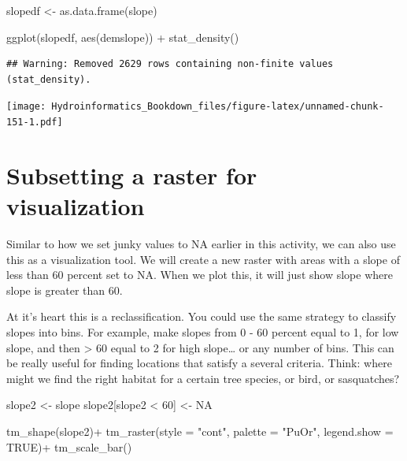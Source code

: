 \documentclass[
]{book}
\newenvironment{Shaded}{\begin{snugshade}}{\end{snugshade}}
\newcommand{\AttributeTok}[1]{\textcolor[rgb]{0.77,0.63,0.00}{#1}}
\newcommand{\ConstantTok}[1]{\textcolor[rgb]{0.00,0.00,0.00}{#1}}
\newcommand{\DecValTok}[1]{\textcolor[rgb]{0.00,0.00,0.81}{#1}}
\newcommand{\FunctionTok}[1]{\textcolor[rgb]{0.00,0.00,0.00}{#1}}
\newcommand{\NormalTok}[1]{#1}
\newcommand{\OtherTok}[1]{\textcolor[rgb]{0.56,0.35,0.01}{#1}}
\newcommand{\SpecialCharTok}[1]{\textcolor[rgb]{0.00,0.00,0.00}{#1}}
\newcommand{\StringTok}[1]{\textcolor[rgb]{0.31,0.60,0.02}{#1}}
\begin{document}
\begin{Shaded}
\begin{Highlighting}[]
\NormalTok{slopedf }\OtherTok{\textless{}{-}} \FunctionTok{as.data.frame}\NormalTok{(slope)}

\FunctionTok{ggplot}\NormalTok{(slopedf, }\FunctionTok{aes}\NormalTok{(demslope)) }\SpecialCharTok{+}
  \FunctionTok{stat\_density}\NormalTok{()}
\end{Highlighting}
\end{Shaded}

\begin{verbatim}
## Warning: Removed 2629 rows containing non-finite values (stat_density).
\end{verbatim}

\texttt{[image: Hydroinformatics\_Bookdown\_files/figure-latex/unnamed-chunk-151-1.pdf]}

\hypertarget{subsetting-a-raster-for-visualization}{%
\section{Subsetting a raster for visualization}\label{subsetting-a-raster-for-visualization}}

Similar to how we set junky values to NA earlier in this activity, we can also use this as a visualization tool. We will create a new raster with areas with a slope of less than 60 percent set to NA. When we plot this, it will just show slope where slope is greater than 60.

At it's heart this is a reclassification. You could use the same strategy to classify slopes into bins. For example, make slopes from 0 - 60 percent equal to 1, for low slope, and then \textgreater{} 60 equal to 2 for high slope\ldots{} or any number of bins. This can be really useful for finding locations that satisfy a several criteria. Think: where might we find the right habitat for a certain tree species, or bird, or sasquatches?

\begin{Shaded}
\begin{Highlighting}[]
\NormalTok{slope2 }\OtherTok{\textless{}{-}}\NormalTok{ slope}
\NormalTok{slope2[slope2 }\SpecialCharTok{\textless{}} \DecValTok{60}\NormalTok{] }\OtherTok{\textless{}{-}} \ConstantTok{NA}

\FunctionTok{tm\_shape}\NormalTok{(slope2)}\SpecialCharTok{+}
  \FunctionTok{tm\_raster}\NormalTok{(}\AttributeTok{style =} \StringTok{"cont"}\NormalTok{, }\AttributeTok{palette =} \StringTok{"PuOr"}\NormalTok{, }\AttributeTok{legend.show =} \ConstantTok{TRUE}\NormalTok{)}\SpecialCharTok{+}
  \FunctionTok{tm\_scale\_bar}\NormalTok{()}
\end{Highlighting}
\end{Shaded}
\end{document}
